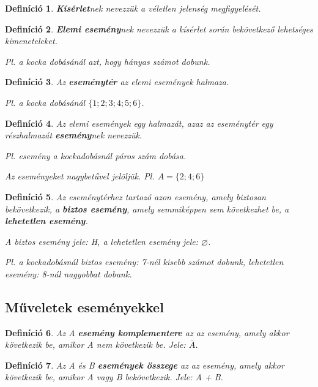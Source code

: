 \documentclass[12pt,a4paper]{article}
\newtheorem{definition}{Definíció} [section]
\begin{document}
\begin{definition}
\textbf{Kísérlet}nek nevezzük a véletlen jelenség megfigyelését.
\end{definition}

\begin{definition}
\textbf{Elemi esemény}nek nevezzük a kísérlet során bekövetkező lehetséges kimeneteleket.

Pl. a kocka dobásánál azt, hogy hányas számot dobunk.
\end{definition}

\begin{definition}
Az \textbf{eseménytér} az elemi események halmaza.

Pl. a kocka dobásánál $\{1; 2; 3; 4; 5; 6\}$.
\end{definition}

\begin{definition}
Az elemi események egy halmazát, azaz az eseménytér egy részhalmazát \textbf{esemény}nek nevezzük.

Pl. esemény a kockadobásnál páros szám dobása.

Az eseményeket nagybetűvel jelöljük. Pl. $A = \{2; 4; 6\}$
\end{definition}

\begin{definition}
Az eseménytérhez tartozó azon esemény, amely biztosan bekövetkezik, a \textbf{biztos esemény}, amely semmiképpen sem következhet be, a \textbf{lehetetlen esemény}.

A biztos esemény jele: H, a lehetetlen esemény jele: $\varnothing$.

Pl. a kockadobásnál biztos esemény: 7-nél kisebb számot dobunk, lehetetlen esemény: 8-nál nagyobbat dobunk.
\end{definition}

\subsection{Műveletek eseményekkel}

\begin{definition}
Az A \textbf{esemény komplementere} az az esemény, amely akkor következik be, amikor A nem következik be. Jele: $\overline{A}$.
\end{definition}

\begin{definition}
Az A és B \textbf{események összege} az az esemény, amely akkor következik be, amikor A vagy B bekövetkezik. Jele: A + B.
\end{definition}
\end{document}
